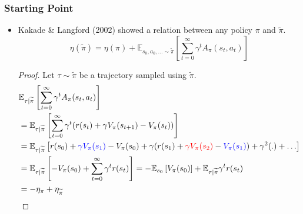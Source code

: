 \documentclass[9pt]{beamer}
\def\blue{\color{blue}}
\def\red{\color{red}}
\DeclarePairedDelimiter\abs{\lvert}{\rvert}%
\theoremstyle{remark}
\begin{document}
\begin{frame}
    \frametitle{Starting Point}
    \begin{itemize}
        \item Kakade \& Langford (2002) showed a relation between any policy $\pi$ and  $\widetilde{\pi}$. 
            \begin{equation}
                \label{eq:starting_point}
        \eta(\widetilde{\pi}) = \eta(\pi) + \mathbb{E}_{s_0, a_0, \ldots  \sim \widetilde{\pi}} \left[ \sum^{\infty}_{t=0} \gamma^{t} A_\pi(s_t, a_t) \right]
            \end{equation} 
    \begin{proof}
    Let $\tau \sim \widetilde{\pi}$ be a  trajectory sampled using $\widetilde{\pi}$.
        \begin{align*}
            &\mathbb{E}_{\tau | \widetilde{\pi}} \left[ \sum^{\infty}_{t=0} \gamma^{t} A_\pi(s_t, a_t) \right] \\
            &= \mathbb{E}_{\tau | \widetilde{\pi}} \left[ \sum^{\infty}_{t=0} \gamma^{t} (r(s_t)+ \gamma V_{\pi}(s_{t+1}) - V_\pi(s_t)) \right] \\
            &= \mathbb{E}_{\tau | \widetilde{\pi}} \left[r(s_0) + {\blue \gamma V_\pi(s_1)} - V_\pi(s_0) + \gamma (r(s_1)+ {\red \gamma V_\pi(s_2)} - {\blue V_\pi(s_1)}) + \gamma^2 (.) + \ldots \right] \\
            &= \mathbb{E}_{\tau | \widetilde{\pi}} \left[ -V_\pi(s_0) + \sum^{\infty}_{t=0} \gamma^{t} r(s_t) \right]
            = - \mathbb{E}_{s_0} \left[ V_\pi(s_0) \right] + \mathbb{E}_{\tau | \widetilde{\pi}} \gamma^{t} r(s_t) \\
            &= -\eta_{\pi} + \eta_{\widetilde{\pi}}
        \end{align*}
    \end{proof}
    \end{itemize}
\end{frame}
\end{document}
